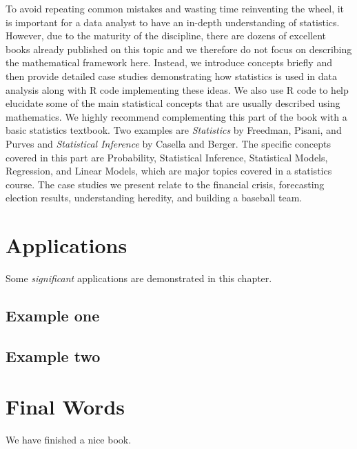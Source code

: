 \documentclass[openany]{book}
\begin{document}
To avoid repeating common mistakes and wasting time reinventing the wheel, it is important for a data analyst to have an in-depth understanding of statistics. However, due to the maturity of the discipline, there are dozens of excellent books already published on this topic and we therefore do not focus on describing the mathematical framework here. Instead, we introduce concepts briefly and then provide detailed case studies demonstrating how statistics is used in data analysis along with R code implementing these ideas. We also use R code to help elucidate some of the main statistical concepts that are usually described using mathematics. We highly recommend complementing this part of the book with a basic statistics textbook. Two examples are \emph{Statistics} by Freedman, Pisani, and Purves and \emph{Statistical Inference} by Casella and Berger. The specific concepts covered in this part are Probability, Statistical Inference, Statistical Models, Regression, and Linear Models, which are major topics covered in a statistics course. The case studies we present relate to the financial crisis, forecasting election results, understanding heredity, and building a baseball team.

\hypertarget{applications}{%
\chapter{Applications}\label{applications}}

Some \emph{significant} applications are demonstrated in this chapter.

\hypertarget{example-one}{%
\section{Example one}\label{example-one}}

\hypertarget{example-two}{%
\section{Example two}\label{example-two}}

\hypertarget{final-words}{%
\chapter{Final Words}\label{final-words}}

We have finished a nice book.


\end{document}

